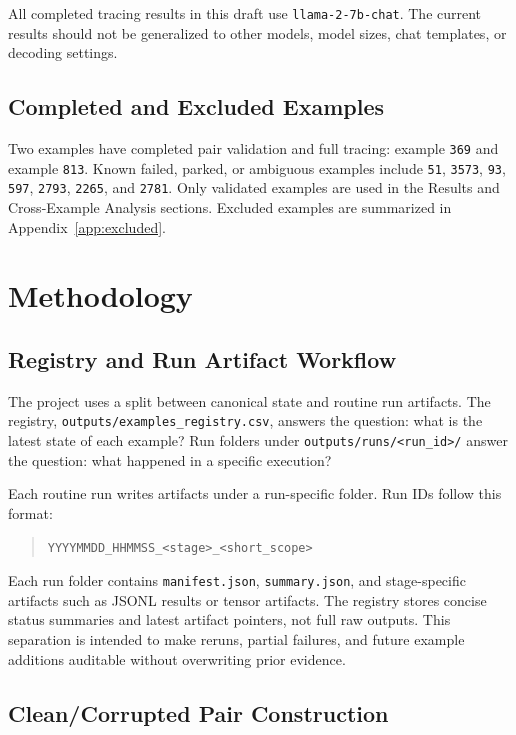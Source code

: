 \documentclass[11pt]{article}
\begin{document}
All completed tracing results in this draft use \texttt{llama-2-7b-chat}. The current results should not be generalized to other models, model sizes, chat templates, or decoding settings.

\subsection{Completed and Excluded Examples}

Two examples have completed pair validation and full tracing: example \texttt{369} and example \texttt{813}. Known failed, parked, or ambiguous examples include \texttt{51}, \texttt{3573}, \texttt{93}, \texttt{597}, \texttt{2793}, \texttt{2265}, and \texttt{2781}. Only validated examples are used in the Results and Cross-Example Analysis sections. Excluded examples are summarized in Appendix~\ref{app:excluded}.

\section{Methodology}

\subsection{Registry and Run Artifact Workflow}

The project uses a split between canonical state and routine run artifacts. The registry, \texttt{outputs/examples\_registry.csv}, answers the question: what is the latest state of each example? Run folders under \texttt{outputs/runs/<run\_id>/} answer the question: what happened in a specific execution?

Each routine run writes artifacts under a run-specific folder. Run IDs follow this format:

\begin{quote}
\texttt{YYYYMMDD\_HHMMSS\_<stage>\_<short\_scope>}
\end{quote}

Each run folder contains \texttt{manifest.json}, \texttt{summary.json}, and stage-specific artifacts such as JSONL results or tensor artifacts. The registry stores concise status summaries and latest artifact pointers, not full raw outputs. This separation is intended to make reruns, partial failures, and future example additions auditable without overwriting prior evidence.

\subsection{Clean/Corrupted Pair Construction}
\end{document}
